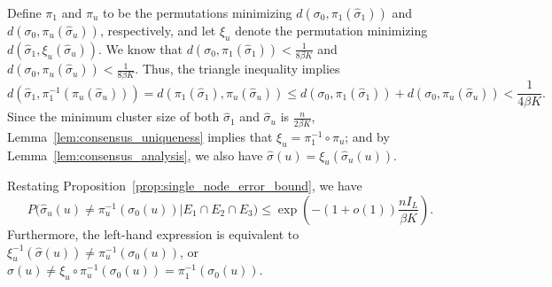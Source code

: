 \documentclass{article}
\begin{document}
Define $\pi_1$ and $\pi_u$ to be the permutations minimizing $d(\sigma_0, \pi_1(\hat \sigma_1))$ and $d(\sigma_0, \pi_u(\hat \sigma_u))$, respectively, and let $\xi_u$ denote the permutation minimizing $d(\hat \sigma_1, \xi_u(\hat \sigma_u))$.
We know that $d(\sigma_0, \pi_1(\hat{\sigma}_1)) < \frac{1}{8 \beta K}$ and $d(\sigma_0, \pi_u(\hat{\sigma}_u)) < \frac{1}{8 \beta K}$. Thus, the triangle inequality implies
\begin{equation*}
d(\hat{\sigma}_1, \pi_1^{-1}( \pi_u(\hat{\sigma}_u))) = d(\pi_1(\hat{\sigma}_1), \pi_u(\hat{\sigma}_u)) \le d(\sigma_0, \pi_1(\hat{\sigma}_1)) + d(\sigma_0, \pi_u(\hat{\sigma}_u)) < \frac{1}{4 \beta K}.
\end{equation*}
Since the minimum cluster size of both $\hat{\sigma}_1$ and $\hat{\sigma}_u$ is $\frac{n}{2 \beta K}$, Lemma~\ref{lem:consensus_uniqueness} implies that $\xi_u = \pi_1^{-1} \circ \pi_u$; and by Lemma~\ref{lem:consensus_analysis}, we also have $\hat \sigma(u) = \xi_u(\hat \sigma_u(u))$.

Restating Proposition~\ref{prop:single_node_error_bound}, we have
\[
 P\bigg(\hat{\sigma}_u(u) \neq \pi^{-1}_u(\sigma_0(u)) \bigg | E_1 \cap E_2 \cap E_3\bigg) \leq \exp\left( - (1+o(1)) \frac{n I_L}{\beta K} \right).
\]
Furthermore, the left-hand expression is equivalent to $\xi_u^{-1}(\hat{\sigma}(u)) \neq \pi_u^{-1}(\sigma_0(u))$, or $\hat{\sigma}(u) \neq \xi_u \circ \pi_u^{-1}(\sigma_0(u)) = \pi_1^{-1}(\sigma_0(u))$.
\end{document}
